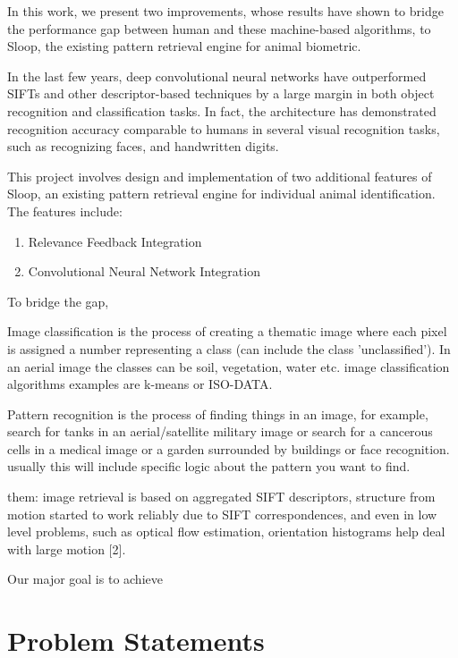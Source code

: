 In this work, we present two improvements, whose results have shown to bridge the performance gap between human and these machine-based algorithms, to Sloop, the existing pattern retrieval engine for animal biometric.

In the last few years, deep convolutional neural networks\cite{lecun95, kriz12} have outperformed SIFTs and other descriptor-based techniques by a large margin in both object recognition and classification tasks\cite{kriz12, fisher14, ILSVRC15}. In fact, the architecture has demonstrated recognition accuracy comparable to humans in several visual recognition tasks, such as recognizing faces\cite{deepface14}, and handwritten digits\cite{mnist13}. 

This project involves design and implementation of two additional features of Sloop, an existing pattern retrieval engine for individual animal identification. The features include:
\begin{enumerate}
	\item Relevance Feedback Integration
	\item Convolutional Neural Network Integration
\end{enumerate}


To bridge the gap, 



Image classification is the process of creating a thematic image where each pixel is assigned a number representing a class (can include the class 'unclassified'). In an aerial image the classes can be soil, vegetation, water etc. image classification algorithms examples are k-means or ISO-DATA.

Pattern recognition is the process of finding things in an image, for example, search for tanks in an aerial/satellite military image or search for a cancerous cells in a medical image or a garden surrounded by buildings or face recognition. usually this will include specific logic about the pattern you want to find.

them: image retrieval is based on aggregated SIFT descriptors, structure from motion started to work reliably due to SIFT correspondences, and even in low level problems, such as optical flow estimation, orientation histograms help deal with large motion [2].

Our major goal is to achieve 

\section{Problem Statements}

